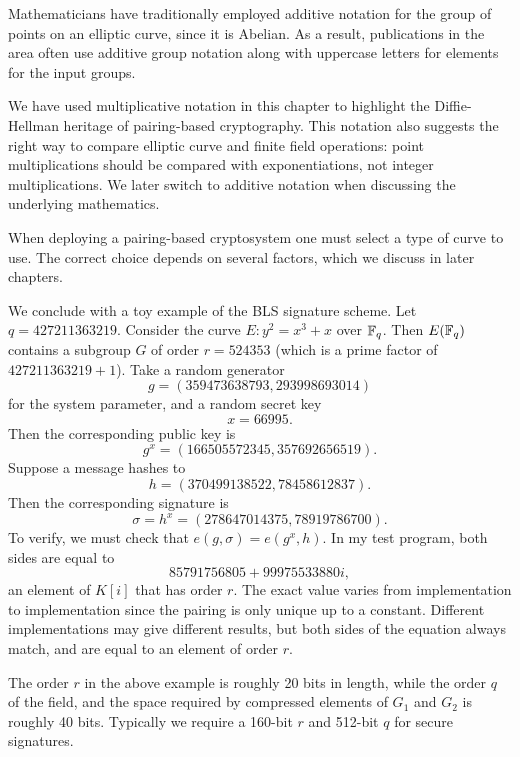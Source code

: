 Mathematicians have traditionally employed additive notation for the group of
points on an elliptic curve, since it is Abelian. As a result, publications in
the area often use additive group notation along with uppercase letters for
elements for the input groups.

We have used multiplicative notation in this chapter to highlight the
Diffie-Hellman heritage of pairing-based cryptography. This notation also
suggests the right way to compare elliptic curve and finite field operations:
point multiplications should be compared with exponentiations, not integer
multiplications. We later switch to additive notation when discussing the
underlying mathematics.

When deploying a pairing-based cryptosystem one must select a type of curve to
use. The correct choice depends on several factors, which we discuss in later
chapters.

We conclude with a toy example of the BLS signature scheme.
Let $q = 427211363219$.
Consider the curve $E : y^2 = x^3 + x$ over
$\mathbb{F}_q$. Then $E(\mathbb{F}_q)$ contains a subgroup
$G$ of order $r = 524353$ (which is a prime factor of $427211363219 + 1$).
Take a random generator
\[ g = (359473638793, 293998693014) \]
for the system parameter, and a random secret key
\[ x = 66995 . \]
Then the corresponding public key is
\[ g^x = (166505572345, 357692656519) . \]
Suppose a message hashes to
\[ h = (370499138522, 78458612837) . \]
Then the corresponding signature is
\[ \sigma = h^x = (278647014375, 78919786700) . \]
To verify, we must check that $e(g, \sigma) = e(g^x , h)$.
In my test program, both sides are equal to
\[ 85791756805 + 99975533880i , \]
an element of $K[i]$ that has order $r$.
The exact value varies from implementation to implementation since the pairing
is only unique up to a constant. Different implementations may give different
results, but both sides of the equation always match, and are equal to an
element of order $r$.

The order $r$ in the above example is roughly 20 bits in length, while the
order $q$ of the field, and the space required by compressed elements of $G_1$
and $G_2$ is roughly 40 bits. Typically we require a 160-bit $r$ and 512-bit
$q$ for secure signatures.
